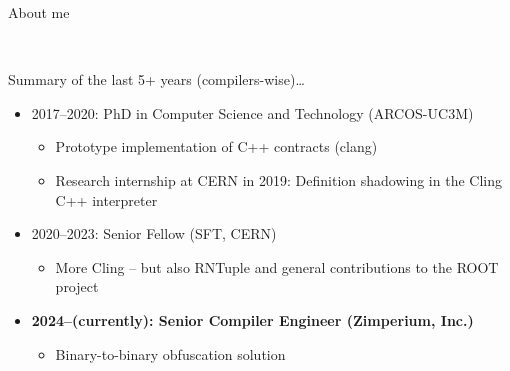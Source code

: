 \begin{frame}{About me}
  \begin{center}
    \\
  \end{center}

  \vfill
  Summary of the last 5+ years (compilers-wise)\ldots{}
  \begin{itemize}
  \item 2017--2020: PhD in Computer Science and Technology (ARCOS-UC3M)
    \begin{itemize}
    \item Prototype implementation of C++ contracts (clang)
    \item Research internship at CERN in 2019: Definition shadowing in the Cling C++ interpreter
    \end{itemize}
    \medskip

  \item 2020--2023: Senior Fellow (SFT, CERN)
    \begin{itemize}
    \item More Cling -- but also RNTuple and general contributions to the ROOT project
    \end{itemize}
    \medskip

  \item \textbf{2024--(currently): Senior Compiler Engineer (Zimperium, Inc.)}
    \begin{itemize}
    \item Binary-to-binary obfuscation solution
    \end{itemize}
  \end{itemize}
\end{frame}
